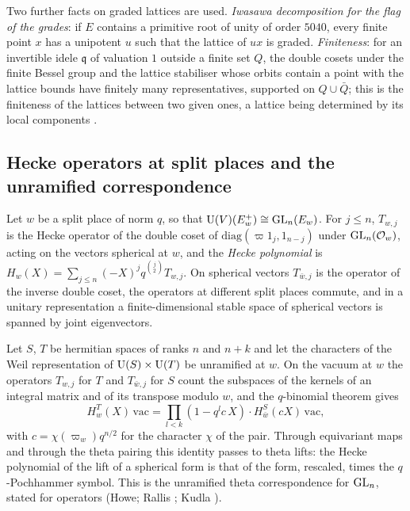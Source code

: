 Two further facts on graded lattices are used. \emph{Iwasawa decomposition for the flag of the grades}: if $E$ contains a primitive root of unity
of order $5040$, every finite point $x$ has a unipotent $u$ such that the lattice of $ux$ is graded. \emph{Finiteness}: for an
invertible idele $\mathfrak q$ of valuation $1$ outside a finite set $Q$, the double cosets under the finite Bessel group and the
lattice stabiliser whose orbits contain a point with the lattice bounds have finitely many representatives, supported on
$Q\cup\bar Q$; this is the finiteness of the lattices between two given ones, a lattice being determined by its local components
\cite[\S81]{OMeara1973}.

\subsection{Hecke operators at split places and the unramified correspondence}\label{ss:B-hecke-transfer}
Let $w$ be a split place of norm $q$, so that $\operatorname{U}(V)(E^+_w)\cong\operatorname{GL}_n(E_w)$. For $j\le n$, $T_{w,j}$ is the Hecke operator of the double coset of
$\mathrm{diag}(\varpi1_j,1_{n-j})$ under $\operatorname{GL}_n(\mathcal{O}_w)$, acting on the vectors spherical at $w$, and the \emph{Hecke polynomial} is
$H_w(X)=\sum_{j\le n}(-X)^jq^{\binom j2}T_{w,j}$. On spherical vectors $T_{\bar w,j}$ is the operator of the inverse double coset, the operators at
different split places commute, and in a unitary representation a finite-dimensional stable space of spherical vectors is spanned by joint
eigenvectors.

Let $S$, $T$ be hermitian spaces of ranks $n$ and $n+k$ and let the characters of the Weil representation of $\operatorname{U}(S)\times\operatorname{U}(T)$ be unramified at
$w$. On the vacuum at $w$ the operators $T_{w,j}$ for $T$ and $T_{\bar w,j}$ for $S$ count the subspaces of the kernels of an integral matrix and of
its transpose modulo $w$, and the $q$-binomial theorem gives
\[
  H^{T}_w(X)\,\mathrm{vac}=\prod_{l<k}(1-q^lc\,X)\cdot H^{S}_{\bar w}(cX)\,\mathrm{vac},
\]
with $c=\chi(\varpi_w)q^{n/2}$ for the character $\chi$ of the pair. Through equivariant maps and through the theta pairing this identity passes to
theta lifts: the Hecke polynomial of the lift of a spherical form is that of the form, rescaled, times the $q$-Pochhammer symbol. This is the
unramified theta correspondence for $\operatorname{GL}_n$, stated for operators (Howe; Rallis \cite{Rallis1982}; Kudla \cite{Kudla1986}).

